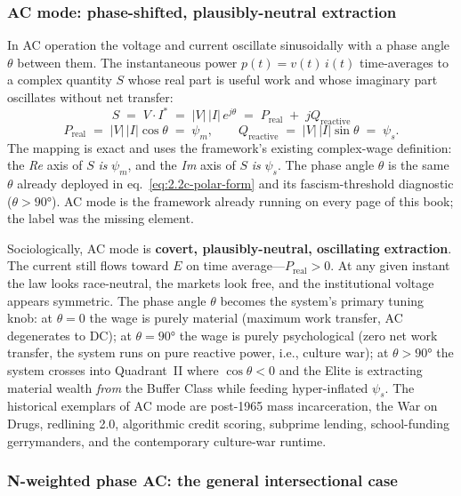 \subsubsection*{AC mode: phase-shifted, plausibly-neutral extraction}

In AC operation the voltage and current oscillate sinusoidally with a
phase angle $\theta$ between them. The instantaneous power
$p(t) = v(t)\,i(t)$ time-averages to a complex quantity $S$ whose real
part is useful work and whose imaginary part oscillates without net
transfer:
\begin{equation}\label{eq:0.8-ac-complex-power}
S \;=\; V \cdot I^{*} \;=\; |V|\,|I|\,e^{j\theta} \;=\; P_{\text{real}} \;+\; jQ_{\text{reactive}}
\end{equation}
\begin{equation}\label{eq:0.9-ac-real-reactive-decomp}
P_{\text{real}} \;=\; |V|\,|I|\cos\theta \;=\; \psi_m, \qquad
Q_{\text{reactive}} \;=\; |V|\,|I|\sin\theta \;=\; \psi_s.
\end{equation}
The mapping is exact and uses the framework's existing
complex-wage definition: the \textit{Re} axis of $S$ \emph{is}
$\psi_m$, and the \textit{Im} axis of $S$ \emph{is} $\psi_s$. The
phase angle $\theta$ is the same $\theta$ already deployed in
eq.~\ref{eq:2.2c-polar-form} and its fascism-threshold diagnostic
($\theta > 90°$). AC mode is the framework already running on every
page of this book; the label was the missing element.

Sociologically, AC mode is \textbf{covert, plausibly-neutral,
oscillating extraction}. The current still flows toward $E$ on time
average---$P_{\text{real}} > 0$. At any given instant the law looks
race-neutral, the markets look free, and the institutional voltage
appears symmetric. The phase angle $\theta$ becomes the system's
primary tuning knob: at $\theta = 0$ the wage is purely material
(maximum work transfer, AC degenerates to DC); at $\theta = 90°$ the
wage is purely psychological (zero net work transfer, the system runs on
pure reactive power, i.e., culture war); at $\theta > 90°$ the system
crosses into Quadrant~II where $\cos\theta < 0$ and the Elite is
extracting material wealth \emph{from} the Buffer Class while feeding
hyper-inflated $\psi_s$. The historical exemplars of AC mode are
post-1965 mass incarceration, the War on Drugs, redlining 2.0,
algorithmic credit scoring, subprime lending, school-funding
gerrymanders, and the contemporary culture-war runtime.

\subsubsection*{N-weighted phase AC: the general intersectional case}

